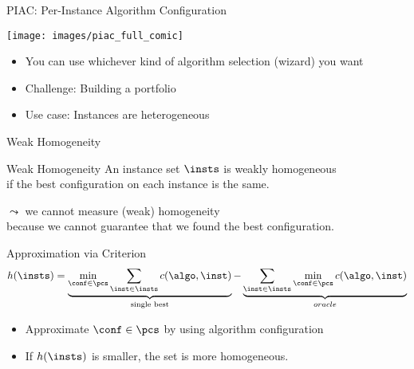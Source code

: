\begin{frame}[c]{PIAC: Per-Instance Algorithm Configuration}

\texttt{[image: images/piac\_full\_comic]}

\pause
\bigskip

\begin{itemize}
  \item You can use whichever kind of algorithm selection (wizard) you want
  \item \alert{Challenge:} Building a portfolio
  \item \alert{Use case:} Instances are heterogeneous
\end{itemize}

\end{frame}
\begin{frame}[c]{Weak Homogeneity}

\begin{block}{Weak Homogeneity}
An instance set $\insts$ is weakly homogeneous\\ if
the best configuration on each instance is the same.

\pause
\medskip
$\leadsto$ we cannot measure (weak) homogeneity\\
because we cannot guarantee that we found the best configuration.
\end{block}

\pause


\begin{block}{Approximation via \cshc{} Criterion }
\begin{equation}
h(\insts) = \underbrace{\min_{\conf \in \pcs} \sum_{\inst \in \insts} c(\algo, \inst)}_{\text{single best}} - \underbrace{\sum_{\inst \in \insts} \min_{\conf \in \pcs} c(\algo, \inst)}_{oracle} \nonumber
\end{equation}

\begin{itemize}
  \item Approximate $\conf \in \pcs$ by using algorithm configuration
  \item If $h(\insts)$ is smaller, the set is more homogeneous.
\end{itemize}

\end{block}

\end{frame}
